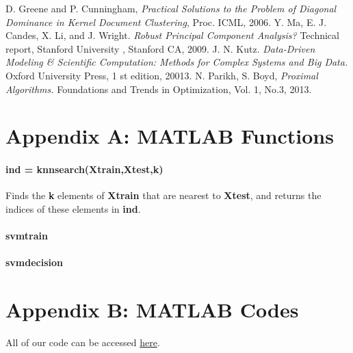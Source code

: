 \documentclass[12pt]{article}
\begin{document}
\begin{thebibliography}{4}
 D. Greene and P. Cunningham, \emph{Practical Solutions to the Problem of Diagonal Dominance in Kernel Document Clustering}, Proc. ICML, 2006.
 Y. Ma, E. J. Candes, X. Li, and J. Wright. \emph{Robust Principal Component Analysis?} Technical report, Stanford University , Stanford CA, 2009.
 J. N. Kutz. \emph{Data-Driven Modeling \& Scientific Computation: Methods for Complex Systems and Big Data.} Oxford University Press, 1 st edition, 20013.
 N. Parikh, S. Boyd, \emph{Proximal Algorithms.} Foundations and Trends in Optimization, Vol. 1, No.3, 2013.
\end{thebibliography}

\newpage
\section*{Appendix A: MATLAB Functions}

\paragraph{ind = knnsearch(Xtrain,Xtest,k)} Finds the \textbf{k} elements of \textbf{Xtrain} that are nearest to \textbf{Xtest}, and returns the indices of these elements in \textbf{ind}.

\paragraph{svmtrain}

\paragraph{svmdecision}

\section*{Appendix B: MATLAB Codes}

All of our code can be accessed {\color{blue}\href{https://github.com/kels271828/582FinalProject.git}{here}}.

\end{document}

